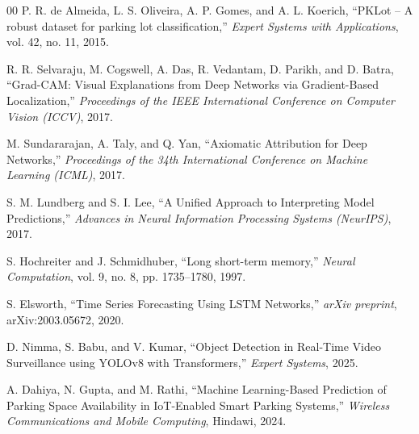 \documentclass[conference]{IEEEtran}
\begin{document}
\begin{thebibliography}{00}
P. R. de Almeida, L. S. Oliveira, A. P. Gomes, and A. L. Koerich, 
``PKLot – A robust dataset for parking lot classification,'' 
\textit{Expert Systems with Applications}, vol. 42, no. 11, 2015.

R. R. Selvaraju, M. Cogswell, A. Das, R. Vedantam, D. Parikh, and D. Batra, 
``Grad-CAM: Visual Explanations from Deep Networks via Gradient-Based Localization,'' 
\textit{Proceedings of the IEEE International Conference on Computer Vision (ICCV)}, 2017.

M. Sundararajan, A. Taly, and Q. Yan, 
``Axiomatic Attribution for Deep Networks,'' 
\textit{Proceedings of the 34th International Conference on Machine Learning (ICML)}, 2017.

S. M. Lundberg and S. I. Lee, 
``A Unified Approach to Interpreting Model Predictions,'' 
\textit{Advances in Neural Information Processing Systems (NeurIPS)}, 2017.

S. Hochreiter and J. Schmidhuber, 
``Long short-term memory,'' 
\textit{Neural Computation}, vol. 9, no. 8, pp. 1735--1780, 1997.

S. Elsworth, 
``Time Series Forecasting Using LSTM Networks,'' 
\textit{arXiv preprint}, arXiv:2003.05672, 2020.

D. Nimma, S. Babu, and V. Kumar, 
``Object Detection in Real-Time Video Surveillance using YOLOv8 with Transformers,'' 
\textit{Expert Systems}, 2025.

A. Dahiya, N. Gupta, and M. Rathi, 
``Machine Learning-Based Prediction of Parking Space Availability in IoT-Enabled Smart Parking Systems,'' 
\textit{Wireless Communications and Mobile Computing}, Hindawi, 2024.

\end{thebibliography}
\end{document}
